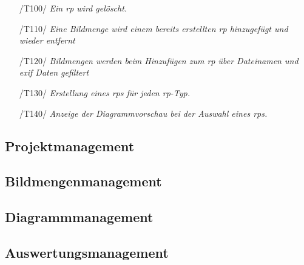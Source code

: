 \begin{description}
\begin{description}
\begin{itemize}
	\item[/T100/]\textit{Ein \gls{rp} wird gelöscht.}\par
	\item[/T110/]\textit{Eine Bildmenge wird einem bereits erstellten \gls{rp} hinzugefügt und wieder entfernt}\par
	\item[/T120/]\textit{Bildmengen werden beim Hinzufügen zum \gls{rp} über Dateinamen und \gls{exif} Daten gefiltert}\par
	\item[/T130/]\textit{Erstellung eines \gls{rp}s für jeden \gls{rp}-Typ.}\par
	\item[/T140/]\textit{Anzeige der Diagrammvorschau bei der Auswahl eines \gls{rp}s. }\par
\end{itemize}
	\end{description}
	\subsection{Projektmanagement}
	\begin{description}
		\begin{itemize}
		\end{itemize}
	\end{description}
	
	\subsection{Bildmengenmanagement}
	\begin{description}
		\begin{itemize}
		\end{itemize}
	\end{description}
	
	\subsection{Diagrammmanagement}
	\begin{description}
		\begin{itemize}
		\end{itemize}
	\end{description}
	
	\subsection{Auswertungsmanagement}
	\begin{description}
		\begin{itemize}
		\end{itemize}
	\end{description}
	

\end{description}
